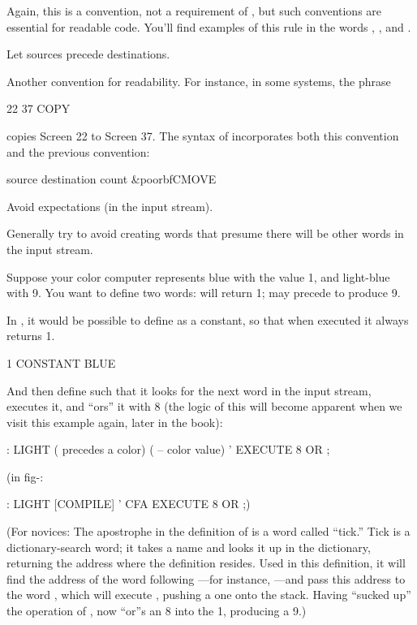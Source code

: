 Again, this is a convention, not a requirement of \Forth{}, but such conventions
are essential for readable code. You'll find examples of this rule
in the words , , and .

\begin{tip}
Let sources precede destinations.
\end{tip}

Another convention for readability. For instance, in some systems, the
phrase
\begin{Code}
22 37 COPY
\end{Code}
copies Screen 22 to Screen 37. The syntax of  incorporates both
this convention and the previous convention:
\begin{Code}[commandchars=\&\{\}]
source destination count &poorbf{CMOVE}
\end{Code}

\begin{tip}
Avoid expectations (in the input stream).
\end{tip}

Generally try to avoid creating words that presume there will be other
words in the input stream.

Suppose your color computer represents blue with the value 1, and
light-blue with 9. You want to define two words:  will return 1;
 may precede  to produce 9.

In \Forth{}, it would be possible to define  as a constant, so
that when executed it always returns 1.

\begin{Code}
1 CONSTANT BLUE
\end{Code}
And then define  such that it looks for the next word in the input
stream, executes it, and ``ors'' it with 8 (the logic of this will become
apparent when we visit this example again, later in the book):
\begin{Code}
: LIGHT  ( precedes a color)  ( -- color value)
     ' EXECUTE  8 OR ;
\end{Code}
(in fig-\Forth{}:
\begin{Code}
: LIGHT [COMPILE] '  CFA EXECUTE  8 OR ;)
\end{Code}
(For novices: The apostrophe in the definition of  is a \Forth{}
word called ``tick.'' Tick is a dictionary-search word; it takes a name and
looks it up in the dictionary, returning the address where the definition
resides. Used in this definition, it will find the address of the word
following ---for instance, ---and pass this address to the word
, which will execute , pushing a one onto the stack.
Having ``sucked up'' the operation of ,  now ``or''s an 8 into
the 1, producing a 9.)

